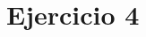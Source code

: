 \documentclass[../../e3_tp2_main.tex]{subfiles}
\begin{document}
\chapter{Ejercicio 4}
\end{document}
